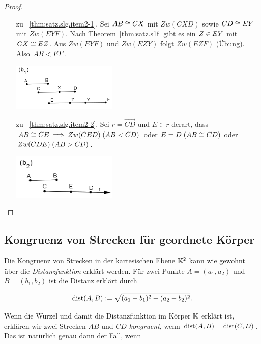 \begin{proof}
\begin{enumerate}
        \item[zu ~\ref{thm:satz.slg.item2-1}.] Sei ${AB} \cong {CX}$ mit $Zw(CXD)$ sowie
            ${CD} \cong {EY}$ mit $Zw(EYF)$. Nach Theorem~\ref{thm:satz.s1f} gibt es ein $Z
            \in {EY}$ mit ${CX} \cong {EZ}$. Aus $Zw(EYF)$ und $Zw(EZY)$ folgt
            $Zw(EZF)$ (Übung). %
            Also ${AB} < {EF}$.

            \centerline{\includegraphics[width=5cm]{BILDER/1-2-06b1-Ord.png}}

        \item[zu ~\ref{thm:satz.slg.item2-2}.] Sei $r = \overrightarrow{CD}$ und $E \in r$ derart,
            dass ${AB} \cong {CE}\; \Longrightarrow\; Zw(CED)\; ({AB} < {CD})$ oder
            $E = D\; ({AB} \cong {CD})$ oder $Zw(CDE)\; ({AB} > {CD})$.

            \centerline{\includegraphics[width=5cm]{BILDER/1-2-06b2-Ord.png}}
    \end{enumerate}
\end{proof}

\subsection*{Kongruenz von Strecken für geordnete Körper}

Die Kongruenz von Strecken in der kartesischen Ebene $\mathbb K^2$ kann wie gewohnt über die {\em
Distanzfunktion} erklärt werden. Für zwei Punkte $A = (a_1,a_2)$ und $B = (b_1,b_2)$ ist die Distanz
erklärt durch

$$
    \operatorname{dist}(A,B) := \sqrt{(a_1-b_1)^2 + (a_2-b_2)^2} .
$$

Wenn die Wurzel und damit die Distanzfunktion im Körper $\mathbb K$ erklärt ist, erklären wir zwei Strecken
$AB$ und $CD$ {\em kongruent}, wenn $\operatorname{dist}(A,B) = \operatorname{dist}(C,D)$. Das ist natürlich genau dann der
Fall, wenn

